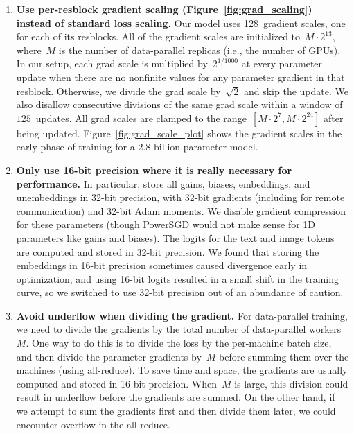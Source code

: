 \documentclass{article}
\begin{document}
\begin{enumerate}
    \item \textbf{Use per-resblock gradient scaling (Figure~\ref{fig:grad_scaling}) instead of standard loss scaling.} Our model uses 128~gradient scales, one for each of its resblocks. All of the gradient scales are initialized to~$M \cdot 2^{13}$, where~$M$ is the number of data-parallel replicas (i.e., the number of GPUs). In our setup, each grad scale is multiplied by~$2^{1 / 1000}$ at every parameter update when there are no nonfinite values for any parameter gradient in that resblock. Otherwise, we divide the grad scale by~$\sqrt{2}$ and skip the update. We also disallow consecutive divisions of the same grad scale within a window of $125$~updates. All grad scales are clamped to the range~$[M \cdot 2^7, M \cdot 2^{24}]$ after being updated. Figure~\ref{fig:grad_scale_plot} shows the gradient scales in the early phase of training for a 2.8-billion parameter model.
    \item \textbf{Only use 16-bit precision where it is really necessary for performance.} In particular, store all gains, biases, embeddings, and unembeddings in 32-bit precision, with 32-bit gradients (including for remote communication) and 32-bit Adam moments. We disable gradient compression for these parameters (though PowerSGD would not make sense for 1D parameters like gains and biases). The logits for the text and image tokens are computed and stored in 32-bit precision. We found that storing the embeddings in 16-bit precision sometimes caused divergence early in optimization, and using 16-bit logits resulted in a small shift in the training curve, so we switched to use 32-bit precision out of an abundance of caution.
    \item \textbf{Avoid underflow when dividing the gradient.} For data-parallel training, we need to divide the gradients by the total number of data-parallel workers~$M$. One way to do this is to divide the loss by the per-machine batch size, and then divide the parameter gradients by~$M$ before summing them over the machines (using all-reduce). To save time and space, the gradients are usually computed and stored in 16-bit precision. When~$M$ is large, this division could result in underflow before the gradients are summed. On the other hand, if we attempt to sum the gradients first and then divide them later, we could encounter overflow in the all-reduce.
    

\end{enumerate}
\end{document}
